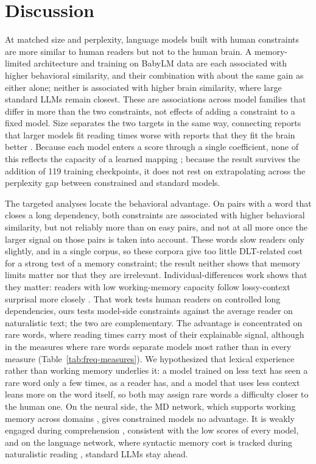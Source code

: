 \section{Discussion}
\label{sec:discussion}

At matched size and perplexity, language models built with human constraints are more similar to human readers but not to the human brain. A memory-limited architecture and training on BabyLM data are each associated with higher behavioral similarity, and their combination with about the same gain as either alone; neither is associated with higher brain similarity, where large standard LLMs remain closest. These are associations across model families that differ in more than the two constraints, not effects of adding a constraint to a fixed model. Size separates the two targets in the same way, connecting reports that larger models fit reading times worse \citep{ohschuler2023why,kuribayashi2021lower,devarda2026behavioral} with reports that they fit the brain better \citep{schrimpf2021neural,caucheteux2022brains}. Because each model enters a score through a single coefficient, none of this reflects the capacity of a learned mapping \citep{alkhamissi-etal-2025-language}; because the result survives the addition of 119 training checkpoints, it does not rest on extrapolating across the perplexity gap between constrained and standard models.

The targeted analyses locate the behavioral advantage. On pairs with a word that closes a long dependency, both constraints are associated with higher behavioral similarity, but not reliably more than on easy pairs, and not at all more once the larger signal on those pairs is taken into account. These words slow readers only slightly, and in a single corpus, so these corpora give too little DLT-related cost for a strong test of a memory constraint; the result neither shows that memory limits matter nor that they are irrelevant. Individual-differences work shows that they matter: readers with low working-memory capacity follow lossy-context surprisal more closely \citep{li2027modeling}. That work tests human readers on controlled long dependencies, ours tests model-side constraints against the average reader on naturalistic text; the two are complementary. The advantage is concentrated on rare words, where reading times carry most of their explainable signal, although in the measures where rare words separate models most rather than in every measure (Table~\ref{tab:freq-measures}). We hypothesized that lexical experience rather than working memory underlies it: a model trained on less text has seen a rare word only a few times, as a reader has, and a model that uses less context leans more on the word itself, so both may assign rare words a difficulty closer to the human one. On the neural side, the MD network, which supports working memory across domains \citep{duncan2010multiple,fedorenko2013broad}, gives constrained models no advantage. It is weakly engaged during comprehension \citep{diachek2020domain}, consistent with the low scores of every model, and on the language network, where syntactic memory cost is tracked during naturalistic reading \citep{shain2022robust}, standard LLMs stay ahead.

